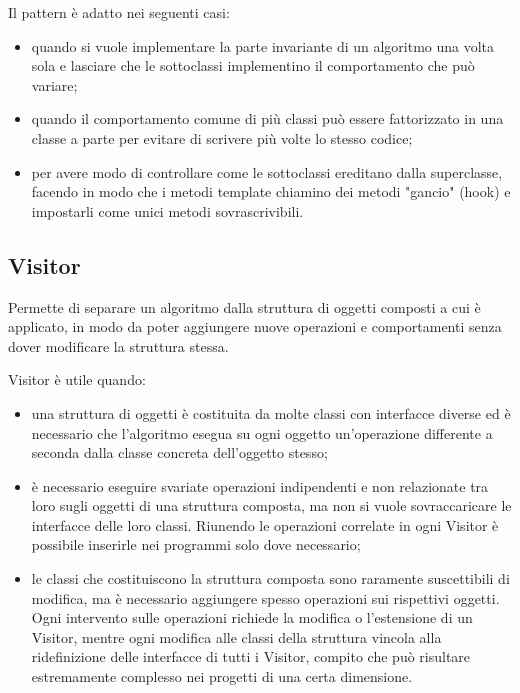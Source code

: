 Il pattern è adatto nei seguenti casi:
\begin{itemize}
\item quando si vuole implementare la parte invariante di un algoritmo una volta sola e lasciare che le sottoclassi implementino il comportamento che può variare;
\item quando il comportamento comune di più classi può essere fattorizzato in una classe a parte per evitare di scrivere più volte lo stesso codice;
\item per avere modo di controllare come le sottoclassi ereditano dalla superclasse, facendo in modo che i metodi template chiamino dei metodi "gancio" (hook) e impostarli come unici metodi sovrascrivibili.
\end{itemize}
\subsection{Visitor}
Permette di separare un algoritmo dalla struttura di oggetti composti a cui è applicato, in modo da poter aggiungere nuove operazioni e comportamenti senza dover modificare la struttura stessa.

Visitor è utile quando:
\begin{itemize}
	\item una struttura di oggetti è costituita da molte classi con interfacce diverse ed è necessario che l'algoritmo esegua su ogni oggetto un'operazione differente a seconda dalla classe concreta dell'oggetto stesso;
	\item è necessario eseguire svariate operazioni indipendenti e non relazionate tra loro sugli oggetti di una struttura composta, ma non si vuole sovraccaricare le interfacce delle loro classi. Riunendo le operazioni correlate in ogni Visitor è possibile inserirle nei programmi solo dove necessario;
	\item le classi che costituiscono la struttura composta sono raramente suscettibili di modifica, ma è necessario aggiungere spesso operazioni sui rispettivi oggetti. Ogni intervento sulle operazioni richiede la modifica o l'estensione di un Visitor, mentre ogni modifica alle classi della struttura vincola alla ridefinizione delle interfacce di tutti i Visitor, compito che può risultare estremamente complesso nei progetti di una certa dimensione.
\end{itemize}


